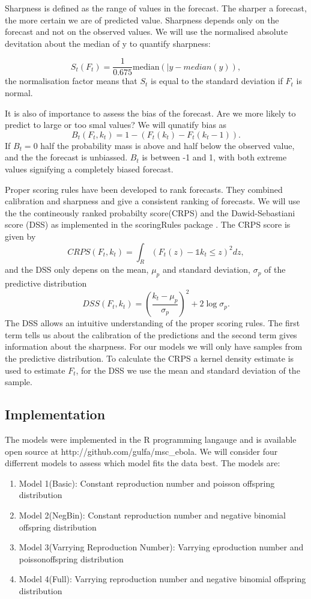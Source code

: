 \documentclass[12pt]{article}
\begin{document}
Sharpness is defined as the range of values in the forecast. The sharper a forecast, the more certain we are of predicted value. Sharpness depends only on the forecast and not on the observed values. We will use the normalised absolute devitation about the median of y to quantify sharpness:

\[ S_t(F_t) = \frac{1}{0.675} \text{median}(|y - median(y)),\]
the normalisation factor means that $S_t$ is equal to the standard deviation if $F_t$ is normal.

It is also of importance to assess the bias of the forecast. Are we more likely to predict to large or too smal values? We will qunatify bias as
\[B_t(F_t, k_t) = 1 - (F_t(k_t) - F_t(k_t - 1)).\]
If $B_t=0$ half the probability mass is above and half below the observed value, and the the forecast is unbiassed. $B_t$ is between -1 and 1, with both extreme values signifying a completely biased forecast.

Proper scoring rules have been developed to rank forecasts. They combined calibration and sharpness and give a consistent ranking of forecasts. We will use the the contineously ranked probabilty score(CRPS) and the Dawid-Sebastiani score (DSS) as implemented in the scoringRules package \cite{jordanEvaluatingProbabilisticForecasts2018}. The CRPS score is given by 
\[CRPS(F_t,k_t) = \int_R(F_t(z) - \mathds{1}{k_t \leq z})^2 dz,\]
and the DSS only depens on the mean, $\mu_p$ and standard deviation, $\sigma_p$ of the predictive distribution
\[DSS(F_t, k_t) = \left(\frac{k_t- \mu_p}{\sigma_p}\right)^2 + 2\log\sigma_p.\]
The DSS allows an intuitive understanding of the proper scoring rules. The first term tells us about the calibration of the predictions and the second term gives information about the sharpness. For our models we will only have samples from the predictive distribution. To calculate the CRPS a kernel density estimate is used to estimate $F_t$, for the DSS we use the mean and standard deviation of the sample. 

\subsection{Implementation}
The models were implemented in the R programming langauge \cite{rcoreteamLanguageEnvironmentStatistical2018} and is available open source at http://github.com/gulfa/msc\_ebola. We will consider four differrent models to assess which model fits the data best. The models are:

\begin{enumerate}
\item{Model 1(Basic): Constant reproduction number and poisson offspring distribution}
\item{Model 2(NegBin): Constant reproduction number and negative binomial offspring distribution}
\item{Model 3(Varrying Reproduction Number): Varrying eproduction number and poissonoffspring distribution}
\item{Model 4(Full): Varrying reproduction number and negative binomial offspring distribution}
\end{enumerate}
\end{document}
